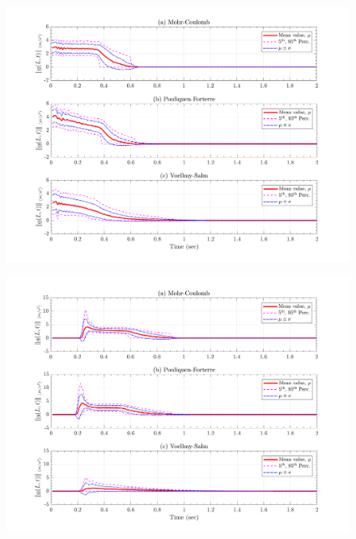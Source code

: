 \documentclass{article}
\begin{document}
\begin{figure}[H]
	\begin{minipage}[b]{0.5\linewidth}
    	\centering
    	\includegraphics[width=1\textwidth]{InclinedPlane/LocalRecords/Records/accel_L1L.png}
    	\label{fig:Ramp-L1-AccL}
	\end{minipage}
	\begin{minipage}[b]{0.5\linewidth}
		\centering
		\includegraphics[width=1\textwidth]{InclinedPlane/LocalRecords/Records/accel_L2L.png}
    	\label{fig:Ramp-L2-AccL}
    \end{minipage}


\end{figure}
\end{document}
